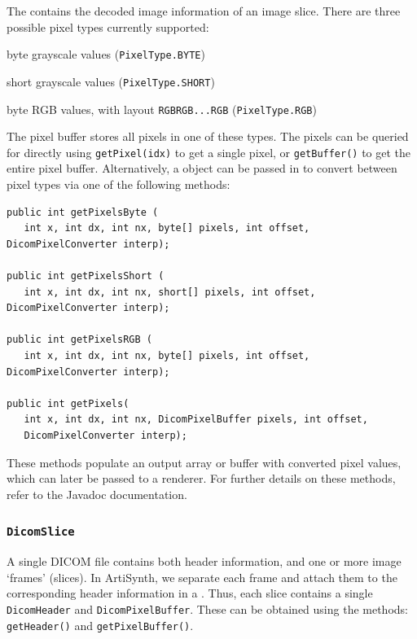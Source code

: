 The  contains the decoded image information of an image slice.
There are three possible pixel types currently supported:
\begin{tightemize}
   \item byte grayscale values (\lstinline{PixelType.BYTE})
   \item short grayscale values (\lstinline{PixelType.SHORT})
   \item byte RGB values, with layout \lstinline{RGBRGB...RGB} (\lstinline{PixelType.RGB})
\end{tightemize}
The pixel buffer stores all pixels in one of these types.  The pixels can be queried for directly
using \lstinline{getPixel(idx)} to get a single pixel, or \lstinline{getBuffer()} to get the
entire pixel buffer.  Alternatively, a  object
can be passed in to convert between pixel types via one of the following methods:
\begin{lstlisting}[]
public int getPixelsByte (
   int x, int dx, int nx, byte[] pixels, int offset, DicomPixelConverter interp);

public int getPixelsShort (
   int x, int dx, int nx, short[] pixels, int offset, DicomPixelConverter interp);

public int getPixelsRGB (
   int x, int dx, int nx, byte[] pixels, int offset, DicomPixelConverter interp);

public int getPixels(
   int x, int dx, int nx, DicomPixelBuffer pixels, int offset, 
   DicomPixelConverter interp);
\end{lstlisting}
These methods populate an output array or buffer with converted pixel values, which can later
be passed to a renderer.  For further details on these methods, refer to the Javadoc documentation.

\subsubsection{\texttt{DicomSlice}}

A single DICOM file contains both header information, and one or more image `frames' (slices).  In
ArtiSynth, we separate each frame and attach them to the corresponding header information in
a .  Thus, each slice contains a single \lstinline{DicomHeader} and 
\lstinline{DicomPixelBuffer}.  These can be obtained using the methods: \lstinline{getHeader()} and
\lstinline{getPixelBuffer()}.  

